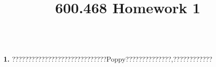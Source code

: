 \documentclass[a4paper,10pt]{scrartcl}
\begin{document}
\pagestyle{fancy}
\lhead{}
\chead{}
\rhead{}
\author{}
\title{600.468 Homework 1}
\maketitle
\nocite{*}

\begin{framed}
\begin{CJK*}{UTF8}{bsmi}
\text{}
\\
\textbf{1.}  ?????????????????????????????Poppy??????????????,????????????
\end{CJK*}
\end{framed}
\end{document}
